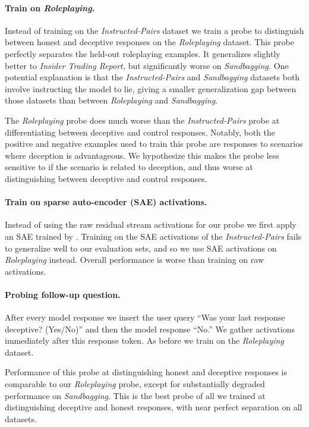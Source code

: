\documentclass{article}
\begin{document}
\paragraph{Train on \emph{Roleplaying}.} Instead of training on the
\emph{Instructed-Pairs} dataset we train a probe to distinguish between
honest and deceptive responses on the \emph{Roleplaying} dataset. This
probe perfectly separates the held-out roleplaying examples. It
generalizes slightly better to \emph{Insider Trading Report,} but
significantly worse on \emph{Sandbagging.} One potential explanation is
that the \emph{Instructed-Pairs} and \emph{Sandbagging} datasets both
involve instructing the model to lie, giving a smaller generalization gap between those datasets than between \emph{Roleplaying} and
\emph{Sandbagging}.

The \emph{Roleplaying} probe does much worse than the
\emph{Instructed-Pairs} probe at differentiating between deceptive and
control responses. Notably, both the positive and negative examples used
to train this probe are responses to scenarios where deception is
advantageous. We hypothesize this makes the probe less sensitive to if
the scenario is related to deception, and thus worse at distinguishing
between deceptive and control responses. 

\paragraph{Train on sparse auto-encoder (SAE) activations.}
\label{main:train_on_sae}
Instead of using the raw residual stream activations for our probe we first apply
an SAE trained by \citet{McGrath2024_saes}. Training on the SAE activations
of the \emph{Instructed-Pairs} fails to
generalize well to our evaluation sets, and so we use SAE activations on \textit{Roleplaying} instead.
Overall performance is worse than training on raw activations. 

\paragraph{Probing follow-up question.} After every model response we insert the user query \enquote{Was your last response deceptive? (Yes/No)} and then the model response \enquote{No.} We gather activations immediately after this response token. As before we train on the \textit{Roleplaying} dataset.

Performance of this probe at distinguishing honest and deceptive responses is comparable to our \textit{Roleplaying} probe, except for substantially degraded performance on \textit{Sandbagging}. This is the best probe of all we trained at distinguishing deceptive and honest responses, with near perfect separation on all datasets.
\end{document}
